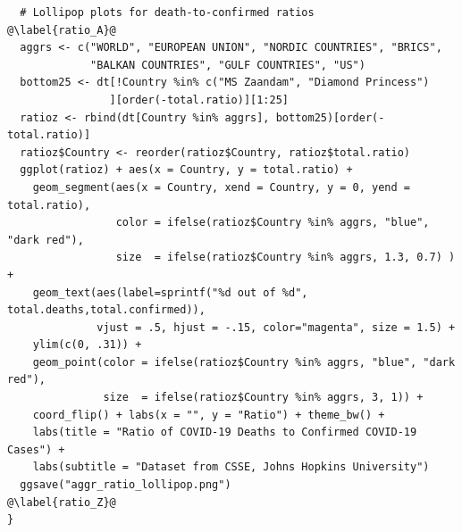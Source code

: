 \begin{verbatim}
  # Lollipop plots for death-to-confirmed ratios                     @\label{ratio_A}@
  aggrs <- c("WORLD", "EUROPEAN UNION", "NORDIC COUNTRIES", "BRICS",
             "BALKAN COUNTRIES", "GULF COUNTRIES", "US")
  bottom25 <- dt[!Country %in% c("MS Zaandam", "Diamond Princess")
                ][order(-total.ratio)][1:25]
  ratioz <- rbind(dt[Country %in% aggrs], bottom25)[order(-total.ratio)]
  ratioz$Country <- reorder(ratioz$Country, ratioz$total.ratio)
  ggplot(ratioz) + aes(x = Country, y = total.ratio) +
    geom_segment(aes(x = Country, xend = Country, y = 0, yend = total.ratio),
                 color = ifelse(ratioz$Country %in% aggrs, "blue", "dark red"),
                 size  = ifelse(ratioz$Country %in% aggrs, 1.3, 0.7) ) +
    geom_text(aes(label=sprintf("%d out of %d", total.deaths,total.confirmed)),
              vjust = .5, hjust = -.15, color="magenta", size = 1.5) +
    ylim(c(0, .31)) +
    geom_point(color = ifelse(ratioz$Country %in% aggrs, "blue", "dark red"),
               size  = ifelse(ratioz$Country %in% aggrs, 3, 1)) +
    coord_flip() + labs(x = "", y = "Ratio") + theme_bw() +
    labs(title = "Ratio of COVID-19 Deaths to Confirmed COVID-19 Cases") +
    labs(subtitle = "Dataset from CSSE, Johns Hopkins University")
  ggsave("aggr_ratio_lollipop.png")                                  @\label{ratio_Z}@
}
\end{verbatim}

